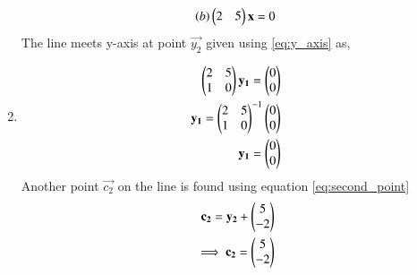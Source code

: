 \begin{enumerate}[label=\thesection.\arabic*.,ref=\thesection.\theenumi]
\begin{align}
\left(b\right)\begin{pmatrix}2&5\end{pmatrix}\mathbf{x}=0
\end{align}
The line meets y-axis at point $\vec{y_2}$ given using \ref{eq:y_axis} as,
\item 
\begin{align}
\begin{pmatrix}2&5\\1&0\end{pmatrix}\mathbf{y_1} =\begin{pmatrix}0\\0\end{pmatrix}
\\
\mathbf{y_1}={\begin{pmatrix}2&5\\1&0\end{pmatrix}}^{-1}\begin{pmatrix}0\\0\end{pmatrix}
\\
\mathbf{y_1}=\begin{pmatrix}0\\0\end{pmatrix}
\end{align}
Another point $\vec{c_2}$ on the line is found using equation \ref{eq:second_point}
\begin{align}
\mathbf{c_2} = \mathbf{y_2} + \begin{pmatrix}5\\-2\end{pmatrix}
\\
\implies \mathbf{c_2} = \begin{pmatrix}5\\-2\end{pmatrix}
\end{align}


\end{enumerate}

